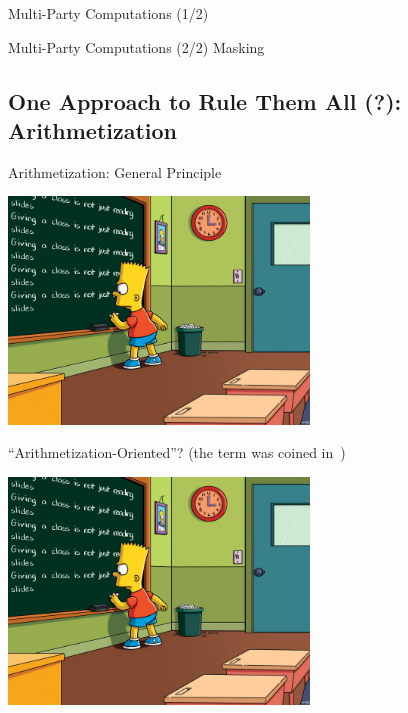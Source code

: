\documentclass[presentation,aspectratio=1610]{beamer}
\begin{document}

\begin{frame}{Multi-Party Computations (1/2)}
  
\end{frame}

\begin{frame}{Multi-Party Computations (2/2)}
  Masking
\end{frame}



\subsection{One Approach to Rule Them All (?): Arithmetization}

\begin{frame}{Arithmetization: General Principle}
  

  \begin{center}
    \includegraphics[width=8cm]{./figures/simpsons}
  \end{center}
  
\end{frame}


\begin{frame}{``Arithmetization-Oriented''?}
  (the term was coined in~\cite{ToSC:AABDS20})
  
  \vfill

  \begin{center}
    \includegraphics[width=8cm]{./figures/simpsons}
  \end{center}
  
  \vfill

\end{frame}
\end{document}
